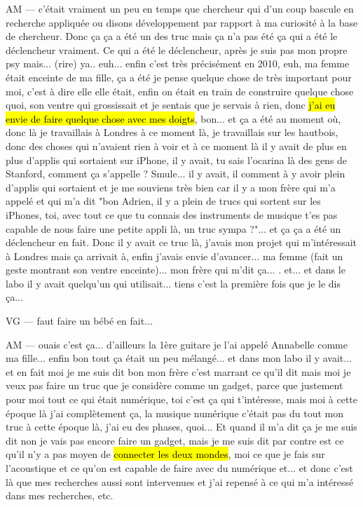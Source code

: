 AM — c'était vraiment un peu en temps que chercheur qui d'un coup bascule en recherche appliquée ou disons développement par rapport à ma curiosité à la base de chercheur. Donc ça ça a été un des truc mais ça n'a pas été ça qui a été le déclencheur vraiment.
Ce qui a été le déclencheur, après je suis pas mon propre psy mais... (rire) ya.. euh... enfin c'est très précisément en 2010, euh, ma femme était enceinte de ma fille, ça a été je pense  quelque chose de très important pour moi, c'est à dire elle elle était, enfin on était en train de construire quelque chose quoi, son ventre qui grossissait et je sentais que je servais à rien, donc \hl{j'ai eu envie de faire quelque chose avec mes doigts}, bon... 
et ça a été au moment où, donc là je travaillais à Londres à ce moment là, je travaillais sur les hautbois, donc des choses qui n'avaient rien à voir et à ce moment là il y avait de plus en plus d'applis qui sortaient sur iPhone, il y avait, tu sais l'ocarina là des gens de Stanford, comment ça s'appelle ? Smule... il y avait, il comment à y avoir plein d'applis qui sortaient et je me souviens très bien car il y a mon frère qui m'a appelé et qui m'a dit "bon Adrien, il y a plein de trucs qui sortent sur les iPhones, toi, avec tout ce que tu connais des instruments de musique t'es pas capable de nous faire une petite appli là, un truc sympa ?"... et ça ça a été un déclencheur en fait.
Donc il y avait ce truc là, j'avais mon projet qui m'intéressait à Londres mais ça arrivait à, enfin j'avais envie d'avancer... ma femme (fait un geste montrant son ventre enceinte)... mon frère qui m'dit ça... . et... et dans le labo il y avait quelqu'un qui utilisait... tiens c'est la première fois que je le dis ça... 

VG — faut faire un bébé en fait... 

AM — ouais c'est ça... d'ailleurs la 1ère guitare je l'ai appelé Annabelle comme ma fille... enfin bon tout ça était un peu mélangé... 
et dans mon labo il y avait... et en fait moi je me suis dit bon mon frère c'est marrant ce qu'il dit mais moi je veux pas faire un truc que je considère comme un gadget, parce que justement pour moi tout ce qui était numérique, toi c'est ça qui t'intéresse, mais moi à cette époque là j'ai complètement ça, la musique numérique c'était pas du  tout mon truc à cette époque là, j'ai eu des phases, quoi... Et quand il m'a dit ça je me suis dit non je vais pas encore faire un gadget,  mais je me suis dit par contre est ce qu'il n'y a pas moyen de \hl{connecter les deux mondes}, moi ce que je fais sur l'acoustique et ce qu'on est capable de faire avec du numérique et... et donc c'est là que mes recherches aussi sont intervenues et j'ai repensé à ce qui m'a intéressé dans mes recherches, etc.

